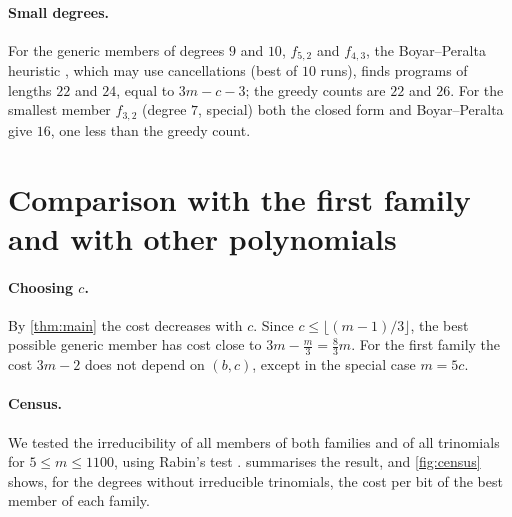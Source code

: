 \documentclass[11pt,a4paper]{article}
\theoremstyle{plain}
\theoremstyle{definition}
\begin{document}
\paragraph{Small degrees.}
For the generic members of degrees $9$ and $10$, $f_{5,2}$ and $f_{4,3}$, the
Boyar--Peralta heuristic \cite{BoyarPeralta2010}, which may use cancellations (best of
$10$ runs), finds programs of lengths $22$ and $24$, equal to $3m-c-3$; the greedy counts
are $22$ and $26$. For the smallest member $f_{3,2}$ (degree $7$, special) both the
closed form and Boyar--Peralta give $16$, one less than the greedy count.

\section{Comparison with the first family and with other polynomials}\label{sec:comparison}

\paragraph{Choosing $c$.}
By \cref{thm:main} the cost decreases with $c$. Since $c\le\lfloor(m-1)/3\rfloor$, the
best possible generic member has cost close to $3m-\tfrac m3=\tfrac83m$. For the first
family the cost $3m-2$ does not depend on $(b,c)$, except in the special case $m=5c$.

\paragraph{Census.}
We tested the irreducibility of all members of both families and of all trinomials for
$5\le m\le1100$, using Rabin's test \cite{Rabin1980}.  summarises the
result, and \cref{fig:census} shows, for the degrees without irreducible trinomials,
the cost per bit of the best member of each family.
\end{document}
